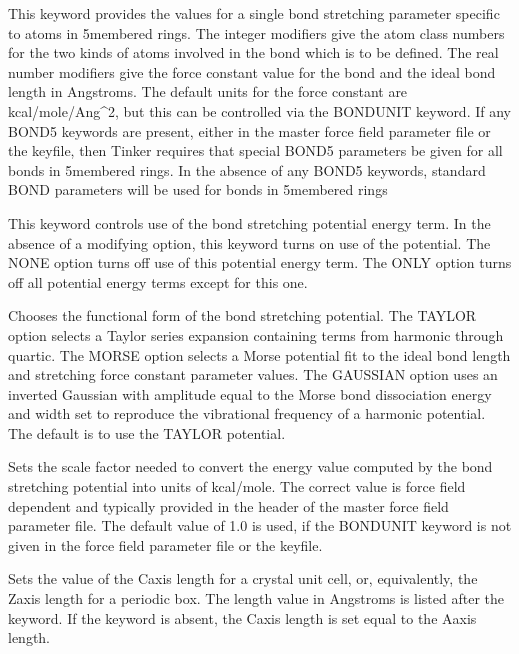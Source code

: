 \documentclass[letterpaper,11pt,english]{sphinxmanual}
\begin{document}
  This keyword provides the values for a single bond stretching parameter specific to atoms in 5\sphinxhyphen{}membered rings. The integer modifiers give the atom class numbers for the two kinds of atoms involved in the bond which is to be defined. The real number modifiers give the force constant value for the bond and the ideal bond length in Angstroms. The default units for the force constant are kcal/mole/Ang\textasciicircum{}2, but this can be controlled via the BONDUNIT keyword. If any BOND5 keywords are present, either in the master force field parameter file or the keyfile, then Tinker requires that special BOND5 parameters be given for all bonds in 5\sphinxhyphen{}membered rings. In the absence of any BOND5 keywords, standard BOND parameters will be used for bonds in 5\sphinxhyphen{}membered rings

  This keyword controls use of the bond stretching potential energy term. In the absence of a modifying option, this keyword turns on use of the potential. The NONE option turns off use of this potential energy term. The ONLY option turns off all potential energy terms except for this one.

  Chooses the functional form of the bond stretching potential. The TAYLOR option selects a Taylor series expansion containing terms from harmonic through quartic. The MORSE option selects a Morse potential fit to the ideal bond length and stretching force constant parameter values. The GAUSSIAN option uses an inverted Gaussian with amplitude equal to the Morse bond dissociation energy and width set to reproduce the vibrational frequency of a harmonic potential. The default is to use the TAYLOR potential.

  Sets the scale factor needed to convert the energy value computed by the bond stretching potential into units of kcal/mole. The correct value is force field dependent and typically provided in the header of the master force field parameter file. The default value of 1.0 is used, if the BONDUNIT keyword is not given in the force field parameter file or the keyfile.

  Sets the value of the C\sphinxhyphen{}axis length for a crystal unit cell, or, equivalently, the Z\sphinxhyphen{}axis length for a periodic box. The length value in Angstroms is listed after the keyword. If the keyword is absent, the C\sphinxhyphen{}axis length is set equal to the A\sphinxhyphen{}axis length.
\end{document}

